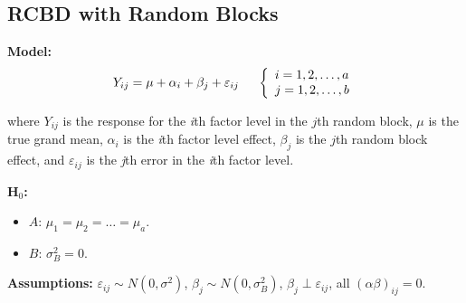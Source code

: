 \documentclass[12pt,english]{article}\usepackage[]{graphicx}\usepackage[table]{xcolor}
\begin{document}
\subsection{RCBD with Random Blocks}

\textbf{Model:} \[Y_{ij} = \mu + \alpha_i + \beta_j + \varepsilon_{ij}\hspace{0.2in} \left\{
                \begin{array}{ll}
                  i = 1,2,\dots,a\\
                  j = 1,2,\dots,b\\
                  \end{array}
              \right.\]

where $Y_{ij}$ is the response for the \textit{i}th factor level in the $j$th random block, $\mu$ is the true grand mean, $\alpha_i$ is the \textit{i}th factor level effect, $\beta_j$ is the $j$th random block effect, and $\varepsilon_{ij}$ is the \textit{j}th error in the \textit{i}th factor level. \\
\vspace{0.05in}

\noindent \textbf{H$_0$:}
\begin{itemize}
\item $A$: $\mu_1 = \mu_2 = \dots = \mu_a$.
\item $B$: $\sigma^2_B = 0$.
\end{itemize}
\vspace{0.1in}

\noindent \textbf{Assumptions:} $\varepsilon_{ij} \sim N(0, \sigma^2)$, \hspace{0.1in} $\beta_j \sim N(0, \sigma^2_B)$, \hspace{0.1in} $\beta_j \perp \varepsilon_{ij}$, \hspace{0.1in} all $(\alpha\beta)_{ij} = 0$.
\vspace{0.1in}
\end{document}
